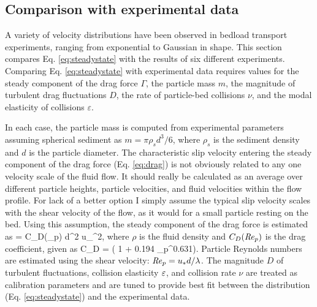 \subsection{Comparison with experimental data}
\label{sec:langexperimentcomparison}

A variety of velocity distributions have been observed in bedload transport experiments, ranging from exponential to Gaussian in shape. 
This section compares Eq. \ref{eq:steadystate} with the results of six different experiments.
Comparing Eq. \ref{eq:steadystate} with experimental data requires values for the steady component of the drag force $\Gamma$, the particle mass $m$, the magnitude of turbulent drag fluctuations $D$, the rate of particle-bed collisions $\nu$, and the modal elasticity of collisions $\varepsilon$.

In each case, the particle mass is computed from experimental parameters assuming spherical sediment as $m = \pi \rho_s d^3/6$, where $\rho_s$ is the sediment density and $d$ is the particle diameter.
The characteristic slip velocity entering the steady component of the drag force (Eq. \ref{eq:drag}) is not obviously related to any one velocity scale of the fluid flow. It should really be calculated as an average over different particle heights, particle velocities, and fluid velocities within the flow profile. For lack of a better option I simply assume the typical slip velocity scales with the shear velocity of the flow, as it would for a small particle resting on the bed. Using this assumption, the steady component of the drag force is estimated as
\be \Gamma =  \rho C_D(\Rey_p) d^2 u_\ast^2,\ee
where $\rho$ is the fluid density and $C_D(\mbox{\textit{Re}}_p)$ is the drag coefficient, given as \citep{Clift1978,Gonzalez2017}
\be C_D = ( 1 + 0.194 \Rey_p^{0.631}). \ee
Particle Reynolds numbers are estimated using the shear velocity: $\mbox{\textit{Re}}_p= u_\ast d/\lambda$. 
The magnitude $D$ of turbulent fluctuations, collision elasticity $\varepsilon$, and collision rate $\nu$ are treated as calibration parameters and are tuned to provide best fit between the distribution (Eq. \ref{eq:steadystate}) and the experimental data.

